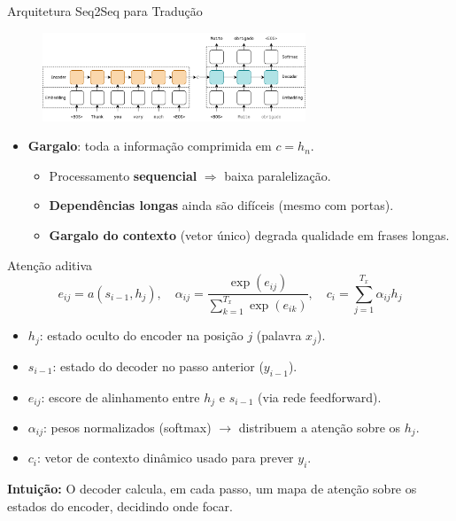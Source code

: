 \documentclass{beamer}
\begin{document}
\begin{frame}{Arquitetura Seq2Seq para Tradução}
	\begin{figure}
		\centering
		\includegraphics[width=0.7\textwidth]{assets/Seq2Seq_NMT.png}
	\end{figure}
	\begin{itemize}
		\item \textbf{Gargalo}: toda a informação comprimida em $c=h_n$.
		\begin{itemize}
			\item Processamento \textbf{sequencial} $\Rightarrow$ baixa paralelização.
			\item \textbf{Dependências longas} ainda são difíceis (mesmo com portas).
			\item \textbf{Gargalo do contexto} (vetor único) degrada qualidade em frases longas.
		\end{itemize}
	\end{itemize}
\end{frame}

\begin{frame}{Atenção aditiva \cite{bahdanau2014neural}}
\[
e_{ij} = a(s_{i-1}, h_j), \quad
\alpha_{ij} = \frac{\exp(e_{ij})}{\sum_{k=1}^{T_x} \exp(e_{ik})}, \quad
c_i = \sum_{j=1}^{T_x} \alpha_{ij} h_j
\]

\begin{itemize}
  \item $h_j$: estado oculto do encoder na posição $j$ (palavra $x_j$).
  \item $s_{i-1}$: estado do decoder no passo anterior ($y_{i-1}$).
  \item $e_{ij}$: escore de alinhamento entre $h_j$ e $s_{i-1}$ (via rede feedforward).
  \item $\alpha_{ij}$: pesos normalizados (softmax) $\to$ distribuem a atenção sobre os $h_j$.
  \item $c_i$: vetor de contexto dinâmico usado para prever $y_i$.
\end{itemize}

\textbf{Intuição:} O decoder calcula, em cada passo, um mapa de atenção sobre os estados do encoder, decidindo onde focar.
\end{frame}
\end{document}
